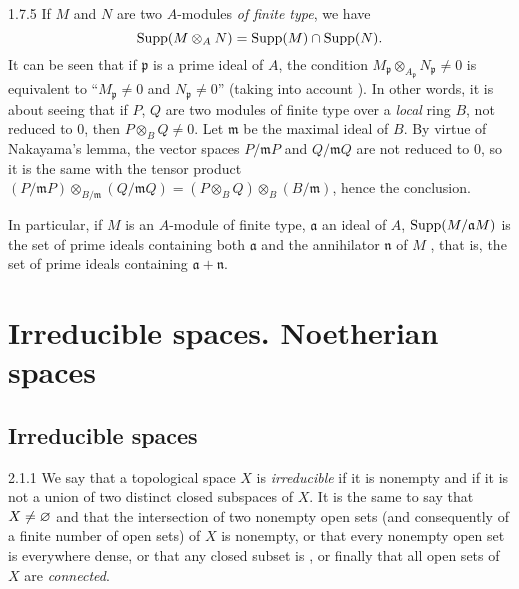 \documentclass{book}
\begin{document}
\begin{env}{1.7.5}
\label{env-0.1.7.5}
If $M$ and $N$ are two $A$-modules \emph{of finite type}, we have
\[
  {\mathop{\mathrm{Supp}}\nolimits}(M\otimes_A N)={\mathop{\mathrm{Supp}}\nolimits}(M)\cap{\mathop{\mathrm{Supp}}\nolimits}(N).
\]
It can be seen that if $\mathfrak{p}$ is a prime ideal of $A$, the condition
$M_\mathfrak{p}\otimes_{A_\mathfrak{p}}N_\mathfrak{p}\neq 0$ is equivalent to
``$M_\mathfrak{p}\neq 0$ and $N_\mathfrak{p}\neq 0$'' (taking into account ). In
other words, it is about seeing that if $P$, $Q$ are two modules of finite type
over a \emph{local} ring $B$, not reduced to $0$, then $P\otimes_B Q\neq 0$. Let
$\mathfrak{m}$ be the maximal ideal of $B$. By virtue of Nakayama's lemma, the vector
spaces $P/\mathfrak{m}P$ and $Q/\mathfrak{m}Q$ are not reduced to $0$, so it is the same with
the tensor product
$(P/\mathfrak{m}P)\otimes_{B/\mathfrak{m}}(Q/\mathfrak{m}Q)=(P\otimes_B Q)\otimes_B(B/\mathfrak{m})$,
hence the conclusion.

In particular, if $M$ is an $A$-module of finite type, $\mathfrak{a}$ an ideal of $A$,
${\mathop{\mathrm{Supp}}\nolimits}(M/\mathfrak{a}M)$ is the set of prime ideals containing both $\mathfrak{a}$ and the
annihilator $\mathfrak{n}$ of $M$ , that is, the set of prime ideals containing
$\mathfrak{a}+\mathfrak{n}$.
\end{env}

\section{Irreducible spaces. Noetherian spaces}
\label{0-prelim-2}

\subsection{Irreducible spaces}
\label{0-prelim-2.1}

\begin{env}{2.1.1}
\label{env-0.2.1.1}
We say that a topological space $X$ is \emph{irreducible} if it is nonempty and
if it is not a union of two distinct closed subspaces of $X$. It is the same to say
that $X\neq\varnothing$ and that the intersection of two nonempty open sets (and consequently
of a finite number of open sets) of $X$ is nonempty, or that every nonempty open set
is everywhere dense, or that any closed subset is , or finally
that all open sets of $X$ are \emph{connected}.
\end{env}
\end{document}
